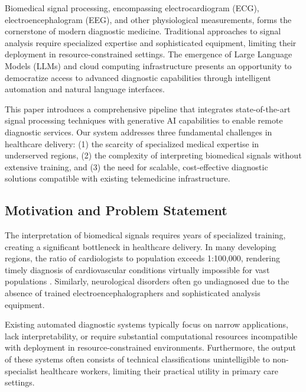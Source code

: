 \documentclass[conference]{IEEEtran}
\begin{document}
Biomedical signal processing, encompassing electrocardiogram (ECG), electroencephalogram (EEG), and other physiological measurements, forms the cornerstone of modern diagnostic medicine. Traditional approaches to signal analysis require specialized expertise and sophisticated equipment, limiting their deployment in resource-constrained settings. The emergence of Large Language Models (LLMs) and cloud computing infrastructure presents an opportunity to democratize access to advanced diagnostic capabilities through intelligent automation and natural language interfaces.

This paper introduces a comprehensive pipeline that integrates state-of-the-art signal processing techniques with generative AI capabilities to enable remote diagnostic services. Our system addresses three fundamental challenges in healthcare delivery: (1) the scarcity of specialized medical expertise in underserved regions, (2) the complexity of interpreting biomedical signals without extensive training, and (3) the need for scalable, cost-effective diagnostic solutions compatible with existing telemedicine infrastructure.

\subsection{Motivation and Problem Statement}
The interpretation of biomedical signals requires years of specialized training, creating a significant bottleneck in healthcare delivery. In many developing regions, the ratio of cardiologists to population exceeds 1:100,000, rendering timely diagnosis of cardiovascular conditions virtually impossible for vast populations \cite{mendis2015}. Similarly, neurological disorders often go undiagnosed due to the absence of trained electroencephalographers and sophisticated analysis equipment.

Existing automated diagnostic systems typically focus on narrow applications, lack interpretability, or require substantial computational resources incompatible with deployment in resource-constrained environments. Furthermore, the output of these systems often consists of technical classifications unintelligible to non-specialist healthcare workers, limiting their practical utility in primary care settings.
\end{document}
